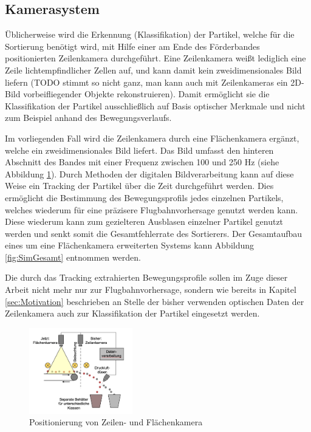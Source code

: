 \subsection{Kamerasystem}
Üblicherweise wird die Erkennung (Klassifikation) der Partikel, welche für die Sortierung benötigt wird, mit Hilfe einer am Ende des Förderbandes positionierten Zeilenkamera durchgeführt. Eine Zeilenkamera weißt lediglich eine Zeile lichtempfindlicher Zellen auf, und kann damit kein zweidimensionales Bild liefern (TODO stimmt so nicht ganz, man kann auch mit Zeilenkameras ein 2D-Bild vorbeifliegender Objekte rekonstruieren). Damit ermöglicht sie die Klassifikation der Partikel ausschließlich auf Basis optischer Merkmale und nicht zum Beispiel anhand des Bewegungsverlaufs.

Im vorliegenden Fall wird die Zeilenkamera durch eine Flächenkamera ergänzt, welche ein zweidimensionales Bild liefert. Das Bild umfasst den hinteren Abschnitt des Bandes mit einer Frequenz zwischen 100 und 250 Hz (siehe Abbildung \ref{fig:SimKameras}). Durch Methoden der digitalen Bildverarbeitung kann auf diese Weise ein Tracking der Partikel über die Zeit durchgeführt werden. Dies ermöglicht die Bestimmung des Bewegungsprofils jedes einzelnen Partikels, welches wiederum für eine präzisere Flugbahnvorhersage genutzt werden kann. Diese wiederum kann zum gezielteren Ausblasen einzelner Partikel genutzt werden und senkt somit die Gesamtfehlerrate des Sortierers. Der Gesamtaufbau eines um eine Flächenkamera erweiterten Systems kann Abbildung \ref{fig:SimGesamt} entnommen werden.

Die durch das Tracking extrahierten Bewegungsprofile sollen im Zuge dieser Arbeit nicht mehr nur zur Flugbahnvorhersage, sondern wie bereits in Kapitel \ref{sec:Motivation} beschrieben an Stelle der bisher verwenden optischen Daten der Zeilenkamera auch zur Klassifikation der Partikel eingesetzt werden.

\begin{figure}[H]
    \centering
    \includegraphics[width=0.4\textwidth]{pics/Kameras.png}
    \caption{Positionierung von Zeilen- und Flächenkamera}
    \label{fig:SimKameras}
\end{figure}


